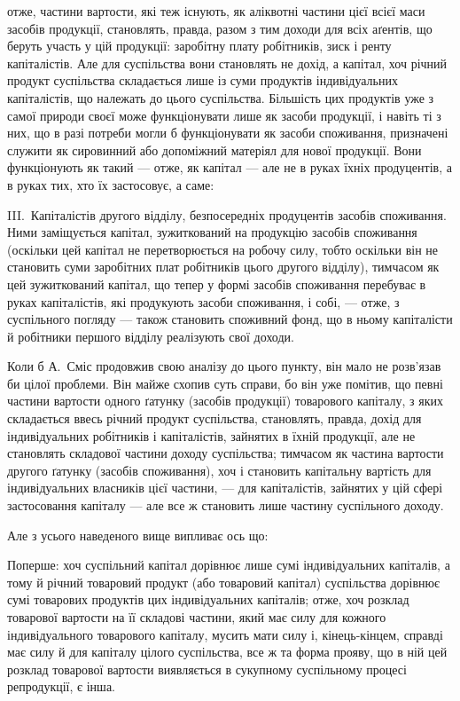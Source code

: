 \parcont{}  %
отже, частини вартости, які теж існують, як аліквотні частини цієї всієї
маси засобів продукції, становлять, правда, разом з тим доходи для
всіх аґентів, що беруть участь у цій продукції: заробітну
плату робітників, зиск і ренту капіталістів. Але для суспільства
вони становлять не дохід, а капітал, хоч річний продукт суспільства
складається лише із суми продуктів індивідуальних капіталістів, що належать
до цього суспільства. Більшість цих продуктів уже з самої природи
своєї може функціонувати лише як засоби продукції, і навіть ті з них,
що в разі потреби могли б функціонувати як засоби споживання, призначені
служити як сировинний або допоміжний матеріял для нової продукції.
Вони функціонують як такий — отже, як капітал — але не в руках
їхніх продуцентів, а в руках тих, хто їх застосовує, а саме:

III.~Капіталістів другого відділу, безпосередніх продуцентів засобів
споживання. Ними заміщується капітал, зужиткований на продукцію
засобів споживання (оскільки цей капітал не перетворюється на робочу
силу, тобто оскільки він не становить суми заробітних плат робітників
цього другого відділу), тимчасом як цей зужиткований капітал, що тепер
у формі засобів споживання перебуває в руках капіталістів, які продукують
засоби споживання, і собі, — отже, з суспільного погляду — також
становить споживний фонд, що в ньому капіталісти
й робітники першого відділу реалізують свої доходи.

Коли б А.~Сміс продовжив свою аналізу до цього пункту, він мало
не роз\-в’я\-зав би цілої проблеми. Він майже схопив суть справи, бо він
уже помітив, що певні частини вартости одного ґатунку (засобів продукції)
товарового капіталу, з яких складається ввесь річний продукт
суспільства, становлять, правда, дохід для індивідуальних робітників і капіталістів,
зайнятих в їхній продукції, але не становлять складової частини
доходу суспільства; тимчасом як частина вартости другого ґатунку
(засобів споживання), хоч і становить капітальну вартість для індивідуальних
власників цієї частини, — для капіталістів, зайнятих у цій сфері
застосовання капіталу — але все ж становить лише частину суспільного
доходу.

Але з усього наведеного вище випливає ось що:

Поперше: хоч суспільний капітал дорівнює лише сумі індивідуальних
капіталів, а тому й річний товаровий продукт (або товаровий капітал)
суспільства дорівнює сумі товарових продуктів цих індивідуальних капіталів;
отже, хоч розклад товарової вартости на її складові частини, який має
силу для кожного індивідуального товарового капіталу, мусить мати силу
і, кінець-кінцем, справді має силу й для капіталу цілого суспільства, все ж
та форма прояву, що в ній цей розклад товарової вартости виявляється
в сукупному суспільному процесі репродукції, є інша.

